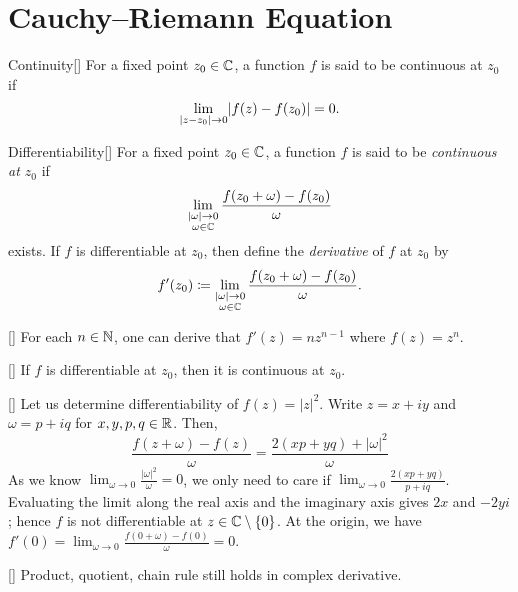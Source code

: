 \documentclass[../complex_variables_1.tex]{subfiles}
\begin{document}
\section{Cauchy--Riemann Equation}

\begin{Definition}{Continuity}[]
    For a fixed point \(z_0 \in \CC\), a function
    \(f\) is said to be continuous at \(z_0\) if
    \[
        \lim_{\lvert z-z_0\rvert \to 0} \lvert f(z)-f(z_0)\rvert = 0\text.
    \]
\end{Definition}

\begin{Definition}{Differentiability}[]
    For a fixed point \(z_0 \in \CC\), a function
    \(f\) is said to be \emph{continuous at \(z_0\)} if
    \[
        \lim_{\substack{|\omega| \to 0 \\ \omega \in \CC}} \frac{f(z_0+\omega) - f(z_0)}{\omega}
    \]
    exists. If \(f\) is differentiable at \(z_0\), then define the \emph{derivative} of \(f\) at
    \(z_0\) by
    \[
        f'(z_0) \coloneqq \lim_{\substack{|\omega| \to 0 \\ \omega \in \CC}} \frac{f(z_0+\omega) -
        f(z_0)}{\omega}\text.
    \]
\end{Definition}

\begin{Example}{}[]
    For each \(n \in \NN\), one can derive that \(f'(z) = nz^{n-1}\) where \(f(z) = z^n\).
\end{Example}

\begin{Theorem}{}[]
    If \(f\) is differentiable at \(z_0\), then it is continuous at \(z_0\).
\end{Theorem}

\begin{Example}{}[]
    Let us determine differentiability of \(f(z) = |z|^2\).
    Write \(z = x+iy\) and \(\omega = p+iq\) for \(x,y,p,q\in\RR\).
    Then,
    \[
        \frac{f(z+\omega)-f(z)}{\omega} = \frac{2(xp+yq)+|\omega|^2}{\omega}
    \]
    As we know \(\lim_{\omega \to 0} \frac{|\omega|^2}{\omega} = 0\), we only need to care if
    \(\lim_{\omega \to 0} \frac{2(xp+yq)}{p+iq}\).
    Evaluating the limit along the real axis and the imaginary axis gives \(2x\) and \(-2yi\);
    hence \(f\) is not differentiable at \(z \in \CC \setminus \{0\}\).
    At the origin, we have \(f'(0) = \lim_{\omega \to 0} \frac{f(0+\omega)-f(0)}{\omega} = 0\).
\end{Example}

\begin{Theorem}{}[]
    Product, quotient, chain rule still holds in complex derivative.
\end{Theorem}
\end{document}
